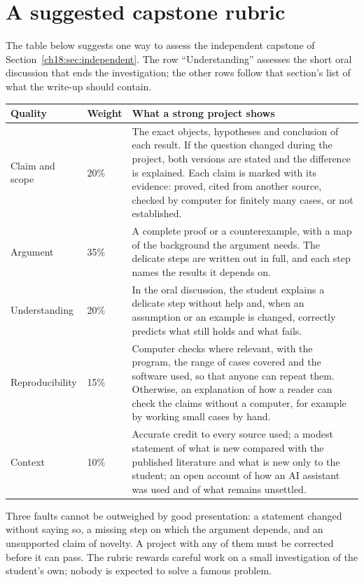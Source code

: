 \section{A suggested capstone rubric}\label{appE:sec:rubric}
The table below suggests one way to assess the independent capstone of Section~\ref{ch18:sec:independent}. The row ``Understanding'' assesses the short oral discussion that ends the investigation; the other rows follow that section's list of what the write-up should contain.
\begin{center}
\begin{tabularx}{\textwidth}{@{}p{1.15in}p{0.5in}X@{}}\toprule
Quality & Weight & What a strong project shows\\\midrule
Claim and scope & 20\% & The exact objects, hypotheses and conclusion of each result. If the question changed during the project, both versions are stated and the difference is explained. Each claim is marked with its evidence: proved, cited from another source, checked by computer for finitely many cases, or not established.\\
Argument & 35\% & A complete proof or a counterexample, with a map of the background the argument needs. The delicate steps are written out in full, and each step names the results it depends on.\\
Understanding & 20\% & In the oral discussion, the student explains a delicate step without help and, when an assumption or an example is changed, correctly predicts what still holds and what fails.\\
Reproducibility & 15\% & Computer checks where relevant, with the program, the range of cases covered and the software used, so that anyone can repeat them. Otherwise, an explanation of how a reader can check the claims without a computer, for example by working small cases by hand.\\
Context & 10\% & Accurate credit to every source used; a modest statement of what is new compared with the published literature and what is new only to the student; an open account of how an AI assistant was used and of what remains unsettled.\\\bottomrule
\end{tabularx}
\end{center}
Three faults cannot be outweighed by good presentation: a statement changed without saying so, a missing step on which the argument depends, and an unsupported claim of novelty. A project with any of them must be corrected before it can pass. The rubric rewards careful work on a small investigation of the student's own; nobody is expected to solve a famous problem.
